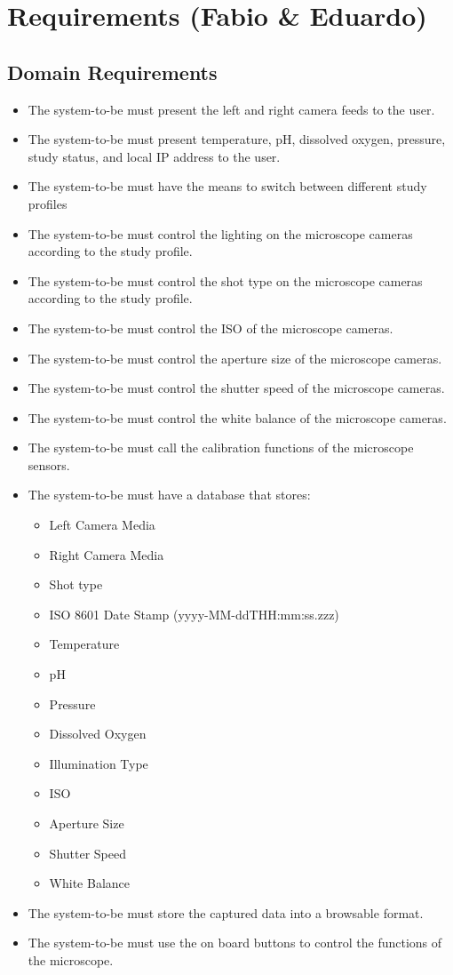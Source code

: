 \section{Requirements (Fabio \& Eduardo)}
\subsection{Domain Requirements}
\begin{itemize}
	\item The system-to-be must present the left and right camera feeds to the user.
	\item The system-to-be must present temperature, pH, dissolved oxygen, pressure, study status, and local IP address to the user.
	\item The system-to-be must have the means to switch between different study profiles
	\item The system-to-be must control the lighting on the microscope cameras according to the study profile.
	\item The system-to-be must control the shot type on the microscope cameras according to the study profile.
	\item The system-to-be must control the ISO of the microscope cameras.
	\item The system-to-be must control the aperture size of the microscope cameras.
	\item The system-to-be must control the shutter speed of the microscope cameras.
	\item The system-to-be must control the white balance of the microscope cameras.
	\item The system-to-be must call the calibration functions of the microscope sensors.
	\item The system-to-be must have a database that stores:
	      \begin{itemize}
		      \item Left Camera Media
		      \item Right Camera Media
		      \item Shot type
		      \item ISO 8601 Date Stamp (yyyy-MM-ddTHH:mm:ss.zzz)
		      \item Temperature
		      \item pH
		      \item Pressure
		      \item Dissolved Oxygen
		      \item Illumination Type
		      \item ISO
		      \item Aperture Size
		      \item Shutter Speed
		      \item White Balance
	      \end{itemize}
	\item The system-to-be must store the captured data into a browsable format.
	\item The system-to-be must use the on board buttons to control the functions of the microscope.
\end{itemize}
